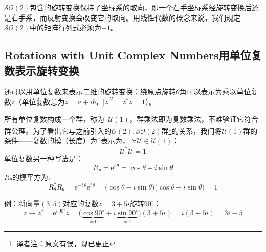$\mathcal{SO}(2)$包含的旋转变换保持了坐标系的取向，即一个右手坐标系经旋转变换后还是右手系，而反射变换会改变它的取向。用线性代数的概念来说，我们规定$\mathcal{SO}(2)$中的矩阵行列式必须为$+1$。

\subsection[用单位复数表示旋转变换]{Rotations with Unit Complex Numbers\quad 用单位复数表示旋转变换}
\label{sec3.2.1}
还可以用单位复数来表示二维的旋转变换：绕原点旋转$\theta$角可以表示为乘以单位复数$z$（单位复数意为$z = a + ib$，$|z|^2 = z^* z = 1$）。

所有单位复数构成一个群，称为\ $\mathcal{U}(1)$，群乘法即为复数乘法，不难验证它符合群公理。为了看出它与之前引入的$\mathcal{O}(2), \mathcal{SO}(2)$群\footnote{译者注：原文有误，现已更正}的关系，我们将$\mathcal{U}(1)$群的条件——复数的模（长度）为1表示为， $\forall \mathcal{U} \in \mathcal{U}(1)$：
\begin{equation}
\label{equ3.11}
\mathcal{U}^* \mathcal{U} = 1
\end{equation}
单位复数另一种写法是：%
\begin{equation}
\label{equ3.12}
R_\theta = \mathrm{e}^{i\,\theta} = \cos \theta + i\sin \theta
\end{equation}
$R_\theta$的模平方为:
\begin{equation}
\label{equ3.13}
R_\theta^* R_\theta = \mathrm{e}^{-i\,\theta} \mathrm{e}^{i\,\theta} = \big( \cos \theta - i \sin \theta  \big) \big( \cos \theta + i \sin \theta \big) = 1
\end{equation}


例：将向量$(3,  5)$对应的复数$z = 3 + 5i$旋转$90^\circ$：
\begin{equation}
\label{equ3.14}
z \rightarrow z' = \mathrm{e}^{i\, 90^\circ}z = \bigg( \underbrace{\cos 90^\circ}_{=0} + i\underbrace{\sin 90^\circ}_{=1} \bigg) (3 + 5i) = i(3 + 5i) = 3i - 5
\end{equation}

